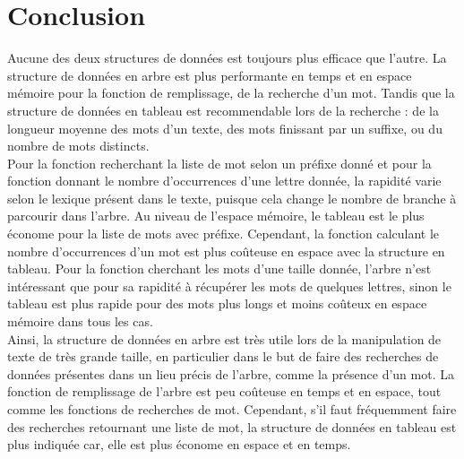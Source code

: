 \documentclass[a4paper,12pt]{article}
\begin{document}
\section{Conclusion}
Aucune des deux structures de données est toujours plus efficace que l'autre. La structure de données en arbre est plus performante en temps et en espace mémoire pour la fonction de remplissage, de la recherche d'un mot. 
Tandis que la structure de données en tableau est recommendable lors de la recherche : de la longueur moyenne des mots d'un texte, des mots finissant par un suffixe, ou du nombre de mots distincts.\\
Pour la fonction recherchant la liste de mot selon un préfixe donné et pour la fonction donnant le nombre d'occurrences d'une lettre donnée, la rapidité varie selon le lexique présent dans le texte, puisque cela change le nombre de branche à parcourir dans l'arbre. Au niveau de l'espace mémoire, le tableau est le plus économe pour la liste de mots avec préfixe. Cependant, la fonction calculant le nombre d'occurrences d'un mot est plus coûteuse en espace avec la structure en tableau.
Pour la fonction cherchant les mots d'une taille donnée, l'arbre n'est intéressant que pour sa rapidité à récupérer les mots de quelques lettres, sinon le tableau est plus rapide pour des mots plus longs et moins coûteux en espace mémoire dans tous les cas. \\

Ainsi, la structure de données en arbre est très utile lors de la manipulation de texte de très grande taille, en particulier dans le but de faire des recherches de données présentes dans un lieu précis de l'arbre, comme la présence d'un mot. La fonction de remplissage de l'arbre est peu coûteuse en temps et en espace, tout comme les fonctions de recherches de mot. Cependant, s'il faut fréquemment faire des recherches retournant une liste de mot, la structure de données en tableau est plus indiquée car, elle est plus économe en espace et en temps.  


\newpage
\appendix

\vspace{5mm}
\noindent
{}
\vspace{2mm}
\end{document}
